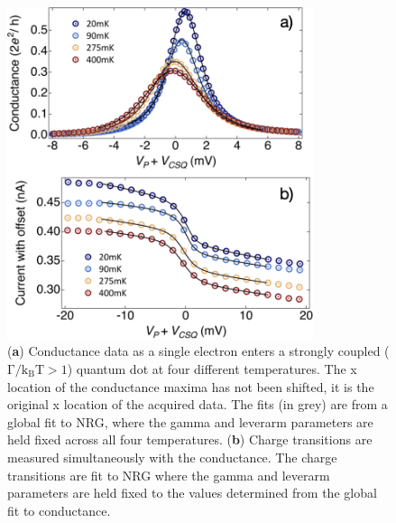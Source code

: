 \begin{figure}[ht]
  \begin{center}
    \includegraphics[width=0.8\textwidth]{figures/ch3/crop_FiguresMaster.013.png}
    \caption[Method to determine gamma and leverarm and fit to charge transitions]{\label{fig:ch3/cond_ct_gf} 
    (\textbf{a}) Conductance data as a single electron enters a strongly coupled ($\mathrm{\Gamma/k_BT > 1}$) quantum dot at four different temperatures. The x location of the conductance maxima has not been shifted, it is the original x location of the acquired data. The fits (in grey) are from a global fit to NRG, where the gamma and leverarm parameters are held fixed across all four temperatures. (\textbf{b}) Charge transitions are measured simultaneously with the conductance. The charge transitions are fit to NRG where the gamma and leverarm parameters are held fixed to the values determined from the global fit to conductance.}
  \end{center}
\end{figure}

